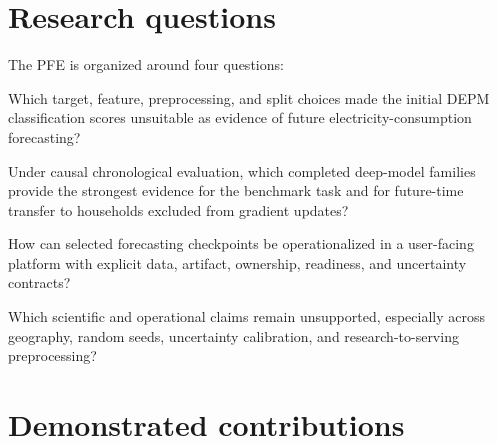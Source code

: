 \section*{Research questions}

The PFE is organized around four questions:
\begin{description}[style=multiline,leftmargin=1.8cm,labelwidth=1.4cm]
  \item[\textbf{RQ1}] Which target, feature, preprocessing, and split choices made the initial DEPM classification scores unsuitable as evidence of future electricity-consumption forecasting?
  \item[\textbf{RQ2}] Under causal chronological evaluation, which completed deep-model families provide the strongest evidence for the benchmark task and for future-time transfer to households excluded from gradient updates?
  \item[\textbf{RQ3}] How can selected forecasting checkpoints be operationalized in a user-facing platform with explicit data, artifact, ownership, readiness, and uncertainty contracts?
  \item[\textbf{RQ4}] Which scientific and operational claims remain unsupported, especially across geography, random seeds, uncertainty calibration, and research-to-serving preprocessing?
\end{description}

\section*{Demonstrated contributions}

